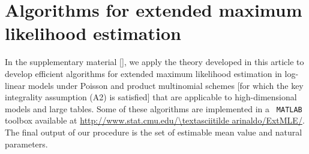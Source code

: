 \documentclass[aos,MSNbibl,nameyear,dvips]{arximspdf}
\begin{document}

\section{Algorithms for extended maximum likelihood estimation}\label
{sec:algo}

In the supplementary material [\citet{FRsupp}], we apply the theory
developed in this article to develop efficient algorithms for extended
maximum likelihood estimation in log-linear models under Poisson and
product multinomial schemes [for which the key integrality assumption
(A2) is satisfied] that are applicable to high-dimensional models and
large tables. Some of these algorithms are implemented in a {\tt
MATLAB} toolbox available at
\url{http://www.stat.cmu.edu/\textasciitilde arinaldo/ExtMLE/}. The final output of
our procedure is the set of estimable mean value and natural
parameters.


\end{document}
